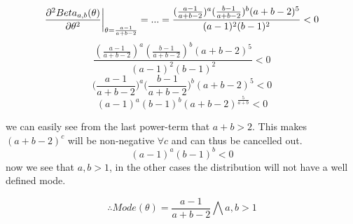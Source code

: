 \documentclass[a4paper,twoside=false,abstract=false,numbers=noenddot,
titlepage=false,headings=small,parskip=half,version=last]{scrartcl}
\begin{document}
\begin{solution}
    \begin{equation}
        {
            \frac{\partial^2{
                Beta_{a,b}(\theta)
            }}{\partial{
                \theta
            }^2}
        }\bigg|_{
            \theta=\frac{a-1}{a+b-2}
        } = ... = 
        \frac{
            (
                \frac{
                    a-1 
                }{
                    a+b-2
                }   
            )^a
            (
                \frac{
                    b-1 
                }{
                    a+b-2
                }   
            )^b
            (a+b-2)^5
        }{
            (a-1)^2(b-1)^2
        } < 0
    \end{equation}
    \begin{equation}
        \frac{
            (
                \frac{
                    a-1 
                }{
                    a+b-2
                }   
            )^a
            (
                \frac{
                    b-1 
                }{
                    a+b-2
                }   
            )^b
            (a+b-2)^5
        }{
            (a-1)^2(b-1)^2
        } < 0
    \end{equation}
    \begin{equation}
        {
            \bigg(
                \frac{
                    a-1 
                }{
                    a+b-2
                }   
            \bigg)^a
            \bigg(
                \frac{
                    b-1 
                }{
                    a+b-2
                }   
            \bigg)^b
            (a+b-2)^5
        } < 0
    \end{equation}
    \begin{equation}
        {
            (
                a-1 
            )^a
            (
                b-1 
            )^b
            (a+b-2)^\frac{5}{a+b}
        } < 0
    \end{equation}

    we can easily see from the last power-term that $a+b>2$.
    This makes $(a+b-2)^c$ will be non-negative $\forall c$ and 
    can thus be cancelled out.
    \begin{equation}
        {
            (
                a-1 
            )^a
            (
                b-1 
            )^b
        } < 0
    \end{equation}
    now we see that $a,b>1$, in the other cases the distribution will not have
    a well defined mode.

    \begin{equation}
        \therefore Mode(\theta) = \frac{a-1}{a+b-2}\bigwedge a,b>1
    \end{equation}


\end{solution}
\end{document}
